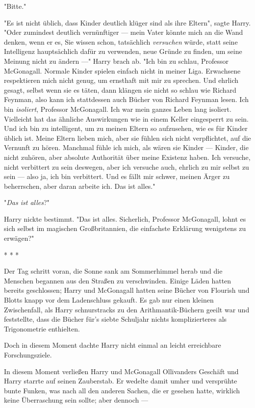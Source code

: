 {"Bitte."

"Es ist nicht üblich, dass Kinder deutlich klüger sind als ihre Eltern", sagte Harry. "Oder zumindest deutlich vernünftiger --- mein Vater könnte mich an die Wand denken, wenn er es, Sie wissen schon, tatsächlich \emph{versuchen} würde, statt seine Intelligenz hauptsächlich dafür zu verwenden, neue Gründe zu finden, um seine Meinung nicht zu ändern ---" Harry brach ab. "Ich bin zu schlau, Professor McGonagall. Normale Kinder spielen einfach nicht in meiner Liga. Erwachsene respektieren mich nicht genug, um ernsthaft mit mir zu sprechen. Und ehrlich gesagt, selbst wenn sie es täten, dann klängen sie nicht so schlau wie Richard Feynman, also kann ich stattdessen auch Bücher von Richard Feynman lesen. Ich bin \emph{isoliert}, Professor McGonagall. Ich war mein ganzes Leben lang isoliert. Vielleicht hat das ähnliche Auswirkungen wie in einem Keller eingesperrt zu sein. Und ich bin zu intelligent, um zu meinen Eltern so aufzusehen, wie es für Kinder üblich ist. Meine Eltern lieben mich, aber sie fühlen sich nicht verpflichtet, auf die Vernunft zu hören. Manchmal fühle ich mich, als wären sie Kinder --- Kinder, die nicht zuhören, aber absolute Authorität über meine Existenz haben. Ich versuche, nicht verbittert zu sein deswegen, aber ich versuche auch, ehrlich zu mir selbst zu sein --- also ja, ich bin verbittert. Und es fällt mir schwer, meinen Ärger zu beherrschen, aber daran arbeite ich. Das ist alles."

"\emph{Das ist alles}?"

Harry nickte bestimmt. "Das ist alles. Sicherlich, Professor McGonagall, lohnt es sich selbst im magischen Großbritannien, die einfachste Erklärung wenigstens zu erwägen?"

* * *

Der Tag schritt voran, die Sonne sank am Sommerhimmel herab und die Menschen begannen aus den Straßen zu verschwinden. Einige Läden hatten bereits geschlossen; Harry und McGonagall hatten seine Bücher von Flourish und Blotts knapp vor dem Ladenschluss gekauft. Es gab nur einen kleinen Zwischenfall, als Harry schnurstracks zu den Arithmantik-Büchern geeilt war und feststellte, dass die Bücher für's siebte Schuljahr nichts komplizierteres als Trigonometrie enthielten.

Doch in diesem Moment dachte Harry nicht einmal an leicht erreichbare Forschungsziele.

In diesem Moment verließen Harry und McGonagall Ollivanders Geschäft und Harry starrte auf seinen Zauberstab. Er wedelte damit umher und versprühte bunte Funken, was nach all den anderen Sachen, die er gesehen hatte, wirklich keine Überraschung sein sollte; aber dennoch ---

}
